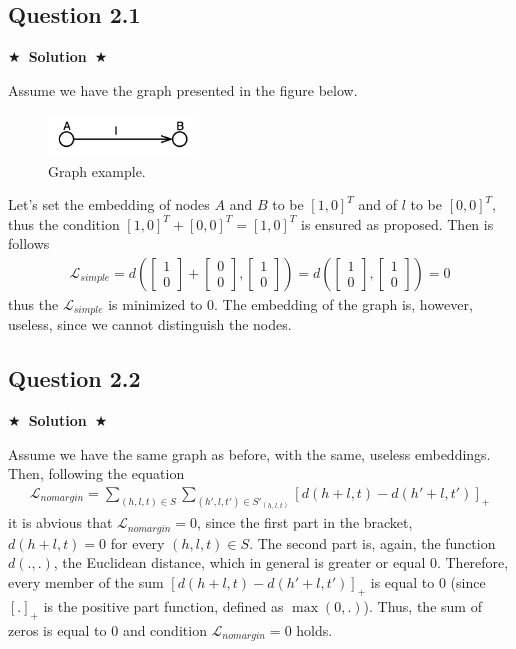 \documentclass{article}
\newcommand{\Solution}[1]{{\medskip \color{black} \bf $\bigstar$~\sf \textbf{Solution}~$\bigstar$ \sf #1 } \bigskip}
\begin{document}
\subsection*{Question 2.1}
\Solution{

  \noindent
Assume we have the graph presented in the figure below. 
\begin{figure}[ht!]
  \centering
  \includegraphics[width=40mm]{Slike/2_1.png}
  \caption{Graph example.}
\end{figure}

\noindent
Let's set the embedding of nodes $A$ and $B$ to be $[1, 0]^T$ and of $l$ to be $[0, 0]^T$, thus the condition $[1, 0]^T + [0, 0]^T = [1, 0]^T$ is ensured as proposed.
Then is follows
\begin{align*}
  \mathcal{L}_{simple} = d \left( \begin{bmatrix} 1 \\ 0 \end{bmatrix} + \begin{bmatrix} 0 \\ 0 \end{bmatrix}, \begin{bmatrix} 1 \\ 0 \end{bmatrix} \right) = d \left( \begin{bmatrix} 1 \\ 0 \end{bmatrix}, \begin{bmatrix} 1 \\ 0 \end{bmatrix} \right) = 0
\end{align*}
thus the $\mathcal{L}_{simple}$ is minimized to 0. The embedding of the graph is, however, useless, since we cannot distinguish the nodes.
}


\subsection*{Question 2.2}
\Solution{

  \noindent
  Assume we have the same graph as before, with the same, useless embeddings.
  Then, following the equation
  \begin{align*}
    \mathcal{L}_{no margin} = \sum_{(h, l, t) \in S} \sum_{(h', l, t') \in S'_{(h, l, t)}} \left[ d(h+ l, t) - d(h' + l, t') \right]_{+}
  \end{align*}
  it is abvious that $\mathcal{L}_{no margin}  = 0$, since the first part in the bracket, $d(h+ l, t) = 0$ for every $(h, l, t) \in S$.
  The second part is, again, the function $d(.,.)$, the Euclidean distance, which in general is greater or equal 0.
  Therefore, every member of the sum $\left[ d(h+ l, t) - d(h' + l, t') \right]_{+}$ is equal to 0 (since $[.]_{+}$ is the positive part function, defined as $\max(0,.)$).
  Thus, the sum of zeros is equal to 0 and condition $ \mathcal{L}_{no margin} = 0$ holds.
}
\end{document}
